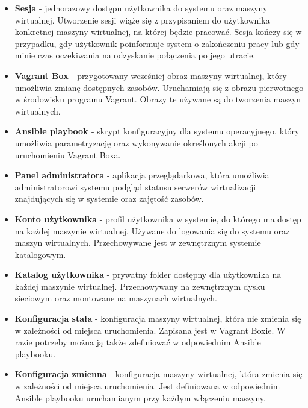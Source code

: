 \documentclass[../wstep.tex]{subfiles}
\begin{document}
\begin{itemize}
  \item \textbf{Sesja} - jednorazowy dostępu użytkownika do systemu oraz maszyny wirtualnej. Utworzenie sesji wiąże się z przypisaniem do użytkownika konkretnej maszyny wirtualnej, na której będzie pracować. Sesja kończy się w przypadku, gdy użytkownik poinformuje system o zakończeniu pracy lub gdy minie czas oczekiwania na odzyskanie połączenia po jego utracie.
  \item \textbf{Vagrant Box \parencite{vagrantbox}} - przygotowany wcześniej obraz maszyny wirtualnej, który umożliwia zmianę dostępnych zasobów. Uruchamiają się z obrazu pierwotnego w środowisku programu Vagrant. Obrazy te używane są do tworzenia maszyn wirtualnych.
  \item \textbf{Ansible playbook \parencite{ansible-playbook}} - skrypt konfiguracyjny dla systemu operacyjnego, który umożliwia parametryzację oraz wykonywanie określonych akcji po uruchomieniu Vagrant Boxa.
  \item \textbf{Panel administratora} - aplikacja przeglądarkowa, która umożliwia administratorowi systemu podgląd statusu serwerów wirtualizacji znajdujących się w systemie oraz zajętość zasobów.
  \item \textbf{Konto użytkownika} - profil użytkownika w systemie, do którego ma dostęp na każdej maszynie wirtualnej. Używane do logowania się do systemu oraz maszyn wirtualnych. Przechowywane jest w zewnętrznym systemie katalogowym.
  \item \textbf{Katalog użytkownika} - prywatny folder dostępny dla użytkownika na każdej maszynie wirtualnej. Przechowywany na zewnętrznym dysku sieciowym oraz montowane na maszynach wirtualnych.
  \item \textbf{Konfiguracja stała} - konfiguracja maszyny wirtualnej, która nie zmienia się w zależności od miejsca uruchomienia. Zapisana jest w Vagrant Boxie. W razie potrzeby można ją także zdefiniować w odpowiednim Ansible playbooku.
  \item \textbf{Konfiguracja zmienna} - konfiguracja maszyny wirtualnej, która zmienia się w zależności od miejsca uruchomienia. Jest definiowana w odpowiednim Ansible playbooku uruchamianym przy każdym włączeniu maszyny.
\end{itemize}
\end{document}
